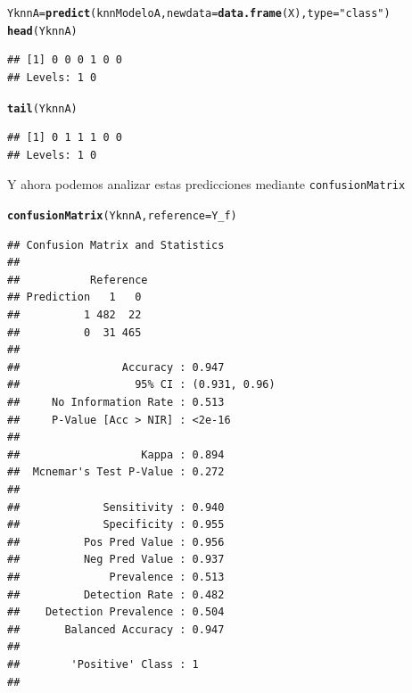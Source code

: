 \documentclass[10pt,a4paper]{article}\usepackage[]{graphicx}\usepackage[]{color}
\makeatletter
\newcommand{\hlstr}[1]{\textcolor[rgb]{0.192,0.494,0.8}{#1}}%
\newcommand{\hlstd}[1]{\textcolor[rgb]{0.345,0.345,0.345}{#1}}%
\newcommand{\hlkwb}[1]{\textcolor[rgb]{0.69,0.353,0.396}{#1}}%
\newcommand{\hlkwc}[1]{\textcolor[rgb]{0.333,0.667,0.333}{#1}}%
\newcommand{\hlkwd}[1]{\textcolor[rgb]{0.737,0.353,0.396}{\textbf{#1}}}%
\newenvironment{kframe}{%
 \def\at@end@of@kframe{}%
 \ifinner\ifhmode%
  \def\at@end@of@kframe{\end{minipage}}%
  \begin{minipage}{\columnwidth}%
 \fi\fi%
 \def\FrameCommand##1{\hskip\@totalleftmargin \hskip-\fboxsep
 \colorbox{shadecolor}{##1}\hskip-\fboxsep
     \hskip-\linewidth \hskip-\@totalleftmargin \hskip\columnwidth}%
 \MakeFramed {\advance\hsize-\width
   \@totalleftmargin\z@ \linewidth\hsize
   \@setminipage}}%
 {\par\unskip\endMakeFramed%
 \at@end@of@kframe}
\newenvironment{knitrout}{}{} %
\makeatother
\begin{document}
\begin{knitrout}
\color{fgcolor}\begin{kframe}
\begin{alltt}
\hlstd{YknnA} \hlkwb{=} \hlkwd{predict}\hlstd{(knnModeloA,} \hlkwc{newdata} \hlstd{=} \hlkwd{data.frame}\hlstd{(X),} \hlkwc{type}\hlstd{=}\hlstr{"class"}\hlstd{)}
\hlkwd{head}\hlstd{(YknnA)}
\end{alltt}
\begin{verbatim}
## [1] 0 0 0 1 0 0
## Levels: 1 0
\end{verbatim}
\begin{alltt}
\hlkwd{tail}\hlstd{(YknnA)}
\end{alltt}
\begin{verbatim}
## [1] 0 1 1 1 0 0
## Levels: 1 0
\end{verbatim}
\end{kframe}
\end{knitrout}

Y ahora podemos analizar estas predicciones mediante {\tt confusionMatrix}
\begin{knitrout}
\color{fgcolor}\begin{kframe}
\begin{alltt}
\hlkwd{confusionMatrix}\hlstd{(YknnA,} \hlkwc{reference} \hlstd{= Y_f)}
\end{alltt}
\begin{verbatim}
## Confusion Matrix and Statistics
## 
##           Reference
## Prediction   1   0
##          1 482  22
##          0  31 465
##                                        
##                Accuracy : 0.947        
##                  95% CI : (0.931, 0.96)
##     No Information Rate : 0.513        
##     P-Value [Acc > NIR] : <2e-16       
##                                        
##                   Kappa : 0.894        
##  Mcnemar's Test P-Value : 0.272        
##                                        
##             Sensitivity : 0.940        
##             Specificity : 0.955        
##          Pos Pred Value : 0.956        
##          Neg Pred Value : 0.937        
##              Prevalence : 0.513        
##          Detection Rate : 0.482        
##    Detection Prevalence : 0.504        
##       Balanced Accuracy : 0.947        
##                                        
##        'Positive' Class : 1            
## 
\end{verbatim}
\end{kframe}
\end{knitrout}
\end{document}
